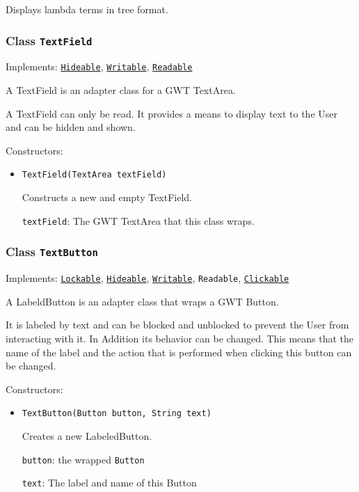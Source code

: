 Displays lambda terms in tree format.

\subsubsection{Class \texttt{TextField}}
\label{type:edu.kit.wavelength.client.view.webui.component.TextField}
Implements: \texttt{\hyperref[type:edu.kit.wavelength.client.view.api.Hideable]{Hideable}}, \texttt{\hyperref[type:edu.kit.wavelength.client.view.api.Writable]{Writable}}, \texttt{\hyperref[type:edu.kit.wavelength.client.view.api.Readable]{Readable}}

A TextField is an adapter class for a GWT TextArea.
 
 A TextField can only be read. It provides a means to display text to the User
 and can be hidden and shown.

Constructors:
\begin{itemize}
\item \texttt{TextField(TextArea textField)}

Constructs a new and empty TextField.

\texttt{textField}: The GWT TextArea that this class wraps.

\end{itemize}

\subsubsection{Class \texttt{TextButton}}
\label{type:edu.kit.wavelength.client.view.webui.component.TextButton}
Implements: \texttt{\hyperref[type:edu.kit.wavelength.client.view.api.Lockable]{Lockable}}, \texttt{\hyperref[type:edu.kit.wavelength.client.view.api.Hideable]{Hideable}}, \texttt{\hyperref[type:edu.kit.wavelength.client.view.api.Writable]{Writable}}, \texttt{Readable}, \texttt{\hyperref[type:edu.kit.wavelength.client.view.api.Clickable]{Clickable}}

A LabeldButton is an adapter class that wraps a GWT Button.

 It is labeled by text and can be blocked and unblocked to prevent the User
 from interacting with it. In Addition its behavior can be changed. This means
 that the name of the label and the action that is performed when clicking
 this button can be changed.

Constructors:
\begin{itemize}
\item \texttt{TextButton(Button button, String text)}

Creates a new LabeledButton.

\texttt{button}: the wrapped \texttt{Button}

\texttt{text}: The label and name of this Button

\end{itemize}

